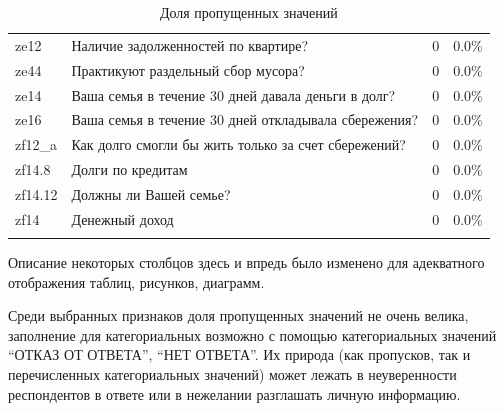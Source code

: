 \documentclass[12pt]{report}
\begin{document}
\begin{longtable}{llcc}
      ze12 &             Наличие задолженностей по квартире? &                                0 &                      0.0\% \\
      ze44 &                                                   Практикуют раздельный сбор мусора? &                                0 &                      0.0\% \\
      ze14 &                                         Ваша семья в течение 30 дней давала деньги в долг? &                                0 &                      0.0\% \\
      ze16 &                                       Ваша семья в течение 30 дней откладывала сбережения? &                                0 &                      0.0\% \\
    zf12\_a & Как долго смогли бы жить только за счет сбережений? &                                0 &                      0.0\% \\
    zf14.8 &                                   Долги по кредитам &                                0 &                      0.0\% \\
   zf14.12 &                                                                               Должны ли Вашей семье? &                                0 &                      0.0\% \\
      zf14 &                                                                                       Денежный доход &                                0 &                      0.0\% \\
    \caption{Доля пропущенных значений}
  \end{longtable}
\begin{note}{}
    Описание некоторых столбцов здесь и впредь было изменено для адекватного отображения таблиц, рисунков, диаграмм.
  \end{note}
  \par
  Среди выбранных признаков доля пропущенных значений не очень велика, заполнение для категориальных возможно с помощью категориальных значений ``ОТКАЗ ОТ ОТВЕТА'', ``НЕТ ОТВЕТА''. Их природа (как пропусков, так и перечисленных категориальных значений) может лежать в неуверенности респондентов в ответе или в нежелании разглашать личную информацию. 
  
\end{document}
